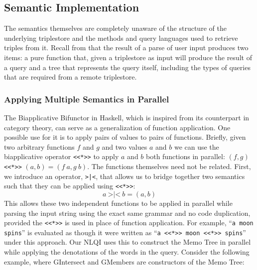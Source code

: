 \documentclass[../main.tex]{subfiles}
\begin{document}
\begin{refsection}
\subsection{Semantic Implementation}

The semantics themselves are completely unaware of the structure of the underlying triplestore and the methods and query languages used to retrieve triples from it.
Recall from  that the result of a parse of user input produces two items: a pure function that, given a triplestore as input will produce the result of a query and a tree that represents the query itself, including the types of queries that are required from a remote triplestore.

\subsubsection{Applying Multiple Semantics in Parallel}

The Biapplicative Bifunctor in Haskell, which is inspired from its counterpart in category theory, can serve as a generalization of function application.  One possible use for it is to apply pairs of values to pairs of functions.  Briefly, given two arbitrary functions $f$ and $g$
and two values $a$ and $b$ we can use the biapplicative operator \texttt{<<*>>} to apply $a$ and $b$ both functions in parallel: $(f, g)$ \texttt{<<*>>} $(a, b) = (f\ a, g\ b)$.  The functions themselves need not be related.
First, we introduce an operator, \texttt{>|<}, that allows us to bridge together two semantics such that they can be applied using \texttt{<<*>>}:
\begin{equation*}
	a\ \texttt{>|<}\ b = (a, b)
\end{equation*}
This allows these two independent functions to be applied in parallel while parsing the input string using the exact same grammar and no code duplication, provided the \texttt{<<*>>} is used in place of function application.  For example, ``\texttt{a moon spins}'' is evaluated as though it were written as ``\texttt{a <<*>> moon <<*>> spins}'' under this approach.  Our NLQI uses this to construct the Memo Tree in parallel while applying the denotations of the words in the query.  Consider the following example, where GIntersect and GMembers are constructors of the Memo Tree:


\end{refsection}
\end{document}
